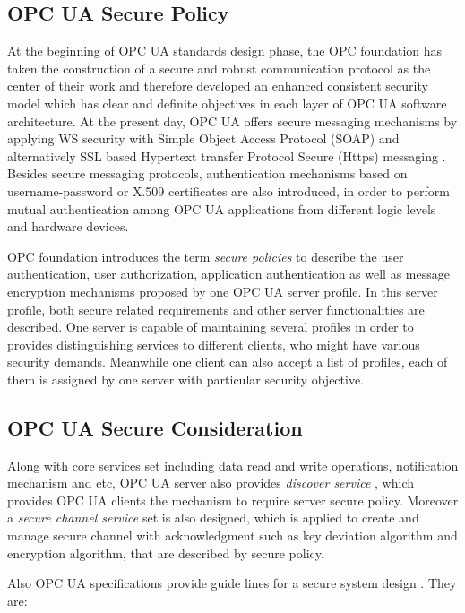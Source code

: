 \subsection{OPC UA Secure Policy}
At the beginning of OPC UA standards design phase, the OPC foundation has taken the construction of a secure and robust communication protocol as the center of their work and therefore developed an enhanced consistent security model which has clear and definite objectives in each layer of OPC UA software architecture. At the present day, OPC UA  offers secure messaging mechanisms by applying WS security with Simple Object Access Protocol (SOAP)  and alternatively SSL based Hypertext transfer Protocol Secure (Https) messaging \cite{opc_secure_1}. Besides secure messaging protocols,  authentication mechanisms based on username-password or X.509 certificates are also introduced, in order to perform mutual authentication among OPC UA applications from different logic levels and hardware devices.

OPC foundation introduces the term \emph{secure policies} \cite{O2} to describe the 
user authentication, user authorization, application authentication as well as message encryption mechanisms proposed by one OPC UA server profile. In this server profile, both secure related requirements and other server functionalities are described. One server is capable of maintaining several profiles in order to provides distinguishing services to different clients, who might have various security demands. Meanwhile one client can also accept a list of profiles, each of them is assigned by one server with particular security objective. 

\subsection{OPC UA Secure Consideration}
Along with core services set including data read and write operations, notification mechanism and etc, OPC UA server also provides \emph{discover service}  \cite{O4}, which provides OPC UA clients the mechanism to require server secure policy. Moreover a \emph{secure channel service} set \cite{O4} is also designed, which is applied to create and manage secure channel with acknowledgment such as key deviation algorithm and encryption algorithm, that are described by secure policy. 

Also OPC UA specifications provide guide lines for a secure system design \cite{O4}. They are:

